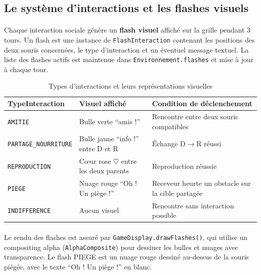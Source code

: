 \bigskip

\subsection{Le système d'interactions et les flashes visuels}

\paragraph{} Chaque interaction sociale génère un \textbf{flash visuel} affiché sur la grille pendant 3 tours. Un flash est une instance de \texttt{FlashInteraction} contenant les positions des deux souris concernées, le type d'interaction et un éventuel message textuel. La liste des flashes actifs est maintenue dans \texttt{Environnement.flashes} et mise à jour à chaque tour.

\begin{table}[h!]
\centering
\renewcommand{\arraystretch}{1.5}
\begin{tabular}{|l|l|p{5.5cm}|}
\hline
\textbf{TypeInteraction} & \textbf{Visuel affiché} & \textbf{Condition de déclenchement} \\
\hline
\texttt{AMITIE} & Bulle verte ``amis !'' & Rencontre entre deux souris compatibles \\
\hline
\texttt{PARTAGE\_NOURRITURE} & Bulle jaune ``info !'' entre D et R & Échange D$\rightarrow$R réussi \\
\hline
\texttt{REPRODUCTION} & Cœur rose $\heartsuit$ entre les deux parents & Reproduction réussie \\
\hline
\texttt{PIEGE} & Nuage rouge ``Oh ! Un piège !'' & Receveur heurte un obstacle sur la cible partagée \\
\hline
\texttt{INDIFFERENCE} & Aucun visuel & Rencontre sans interaction possible \\
\hline
\end{tabular}
\caption{Types d'interactions et leurs représentations visuelles}
\label{tab:interactions}
\end{table}

\paragraph{} Le rendu des flashes est assuré par \texttt{GameDisplay.drawFlashes()}, qui utilise un compositing alpha (\texttt{AlphaComposite}) pour dessiner les bulles et nuages avec transparence. Le flash PIEGE est un nuage rouge dessiné au-dessus de la souris piégée, avec le texte ``Oh ! Un piège !'' en blanc.

